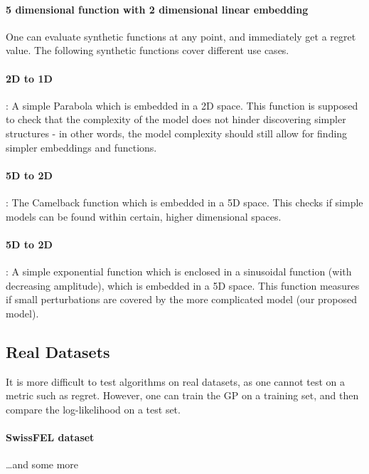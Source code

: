 \paragraph{5 dimensional function with 2 dimensional linear embedding}

One can evaluate synthetic functions at any point, and immediately get a regret value.
The following synthetic functions cover different use cases.

\paragraph{2D to 1D}: A simple Parabola which is embedded in a 2D space.
This function is supposed to check that the complexity of the model does not hinder discovering simpler structures - in other words, the model complexity should still allow for finding simpler embeddings and functions.
\paragraph{5D to 2D}: The Camelback function which is embedded in a 5D space.
This checks if simple models can be found within certain, higher dimensional spaces.
\paragraph{5D to 2D}: A simple exponential function which is enclosed in a sinusoidal function (with decreasing amplitude), which is embedded in a 5D space.
This function measures if small perturbations are covered by the more complicated model (our proposed model).

\subsection{Real Datasets}
It is more difficult to test algorithms on real datasets, as one cannot test on a metric such as regret.
However, one can train the GP on a training set, and then compare the log-likelihood on a test set.

\paragraph{SwissFEL dataset}
\dots and some more 


